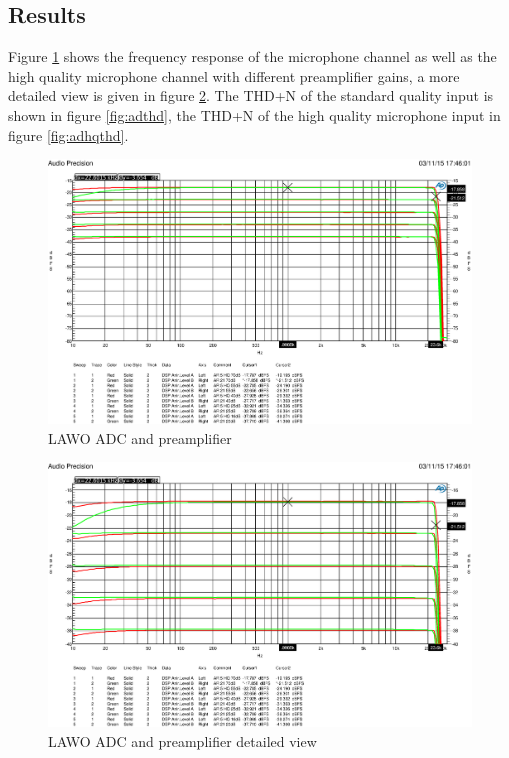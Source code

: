\documentclass[11pt]{report}
\begin{document}
	\subsection{Results}
Figure \ref{fig:adlawo} shows the frequency response of the microphone channel as well as the high quality microphone channel with different preamplifier gains, a more detailed view is given in figure \ref{fig:adlawovergleich}. The THD+N of the standard quality input is shown in figure \ref{fig:adthd}, the THD+N of the high quality microphone input in figure \ref{fig:adhqthd}.
\begin{figure}[htbp]
\begin{center}
\includegraphics[width=14cm,keepaspectratio=true]{LAWOVorverstaerker5u21dB}
\caption{LAWO ADC and preamplifier}
\label{fig:adlawo}
\end{center}
\end{figure}

\begin{figure}[htbp]
\begin{center}
\includegraphics[width=14cm,keepaspectratio=true]{LAWOVorverstaerker5u21dBVergleichszoom}
\caption{LAWO ADC and preamplifier detailed view}
\label{fig:adlawovergleich}
\end{center}
\end{figure}
\end{document}
